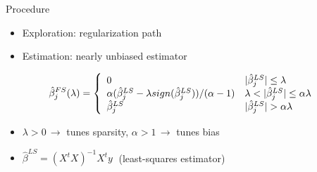 \documentclass[,table]{beamer}
\newcommand{\soustitre}[1]{\vspace{5pt}{\small\textbf{\textcolor{bleuL}{#1}}}} %
\newcommand{\exemple}[1]{\textcolor{vertL!92!black}{#1}} %
\begin{document}
\begin{frame}{}
\begin{columns}[t]

    \begin{column}{.45\linewidth}
      \begin{block}{Procedure}
        \soustitre{Firm Shrinkage / MC+}
        \begin{itemize}
        \item Exploration: \exemple{regularization path} 
        \item Estimation: \exemple{nearly unbiased} estimator
        \end{itemize}
        \begin{displaymath}
          \hat\beta^{FS}_j(\lambda) = \left\{
            \begin{array}{l l}
              0 & |\hat\beta^{LS}_j|\le \lambda \\
              \alpha(\hat\beta^{LS}_j-\lambda sign(\hat\beta^{LS}_j))/(\alpha-1) & \lambda<|\hat\beta^{LS}_j|\le \alpha\lambda \\
              \hat\beta^{LS}_j & |\hat\beta^{LS}_j|> \alpha\lambda
            \end{array}
          \right.
        \end{displaymath}
        {\small
          \begin{itemize}
          \item $\lambda>0 \, \rightarrow$ tunes sparsity, $\alpha>1 \, \rightarrow$ tunes bias
            \vspace{5pt}
          \item $\hat\beta^{LS}= (X^tX)^{-1}X^ty\;$ (least-squares estimator)
          \end{itemize}
        }      \vspace{40pt}


\end{block}
\end{column}
\end{columns}
\end{frame}
\end{document}
